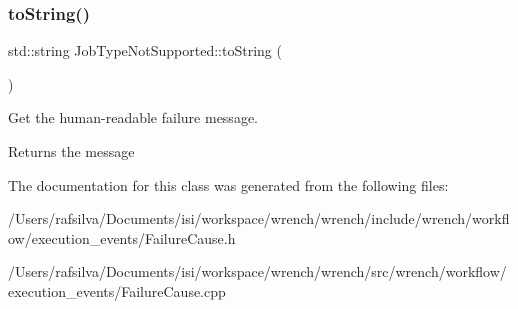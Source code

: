 \subsubsection{\texorpdfstring{to\+String()}{toString()}}
{\footnotesize\ttfamily std\+::string Job\+Type\+Not\+Supported\+::to\+String (\begin{DoxyParamCaption}{ }\end{DoxyParamCaption})}



Get the human-\/readable failure message. 

\begin{DoxyReturn}{Returns}
the message 
\end{DoxyReturn}


The documentation for this class was generated from the following files\+:\begin{DoxyCompactItemize}
\item 
/\+Users/rafsilva/\+Documents/isi/workspace/wrench/wrench/include/wrench/workflow/execution\+\_\+events/Failure\+Cause.\+h\item 
/\+Users/rafsilva/\+Documents/isi/workspace/wrench/wrench/src/wrench/workflow/execution\+\_\+events/Failure\+Cause.\+cpp\end{DoxyCompactItemize}
